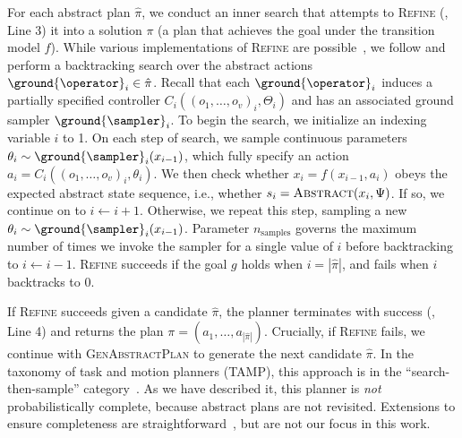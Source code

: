 

For each abstract plan $\hat{\pi}$, we conduct an inner search that attempts to \textsc{Refine} (, Line 3) it into a solution $\pi$ (a plan that achieves the goal under the transition model $f$). While various implementations of \textsc{Refine} are possible~\cite{chitnis2016guided}, we follow \citet{srivastava2014combined} and perform a backtracking search over the abstract actions $\ground{\operator}_i \in \hat{\pi}$. 
Recall that each $\ground{\operator}_i$ induces a partially specified controller $C_i((o_1, \dots, o_v)_i, \Theta_i)$ and has an associated ground sampler $\ground{\sampler}_i$.
To begin the search, we initialize an indexing variable $i$ to 1.
On each step of search, we sample continuous parameters $\theta_i \sim \ground{\sampler}_i(x_{i-1})$, which fully specify an action $a_i = C_i((o_1, \dots, o_v)_i, \theta_i)$. We then check whether $x_i = f(x_{i-1}, a_i)$ obeys the expected abstract state sequence, i.e., whether $s_i = \textsc{Abstract}(x_i, \Psi)$. If so, we continue on to $i \gets i + 1$. Otherwise, we repeat this step, sampling a new $\theta_i \sim \ground{\sampler}_i(x_{i-1})$. Parameter $n_{\text{samples}}$ governs the maximum number of times we invoke the sampler for a single value of $i$ before backtracking to $i \gets i - 1$. \textsc{Refine} succeeds if the goal $g$ holds when $i = |\hat{\pi}|$, and fails when $i$ backtracks to 0.

If \textsc{Refine} succeeds given a candidate $\hat{\pi}$, the planner terminates with success (, Line 4) and returns the plan $\pi = (a_1, \ldots, a_{|\hat{\pi}|})$. Crucially, if \textsc{Refine} fails, we continue with \textsc{GenAbstractPlan} to generate the next candidate $\hat{\pi}$.
In the taxonomy of task and motion planners (TAMP), this approach is in the ``search-then-sample'' category~\cite{srivastava2014combined,dantam2016incremental,garrett2021integrated}.
As we have described it, this planner is \emph{not} probabilistically complete, because abstract plans are not revisited.
Extensions to ensure completeness are straightforward~\cite{chitnis2016guided}, but are not our focus in this work.

